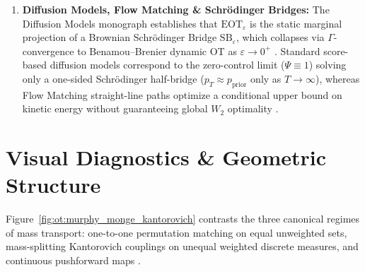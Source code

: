 \documentclass[../../../../master.tex]{subfiles}
\begin{document}
\begin{crossbook}
\begin{enumerate}[leftmargin=1.4em]
  \item \textbf{Diffusion Models, Flow Matching \& Schr\"odinger Bridges:} The Diffusion Models monograph establishes that $\mathrm{EOT}_\varepsilon$ is the static marginal projection of a Brownian Schr\"odinger Bridge $\mathrm{SB}_\varepsilon$, which collapses via $\Gamma$-convergence to Benamou--Brenier dynamic OT as $\varepsilon \to 0^+$ . Standard score-based diffusion models correspond to the zero-control limit ($\Psi \equiv 1$) solving only a one-sided Schr\"odinger half-bridge ($p_T \approx p_{\mathrm{prior}}$ only as $T \to \infty$), whereas Flow Matching straight-line paths optimize a conditional upper bound on kinetic energy without guaranteeing global $W_2$ optimality .
\end{enumerate}
\end{crossbook}

\section{Visual Diagnostics \& Geometric Structure}
\label{sec:ot:visuals}

Figure~\ref{fig:ot:murphy_monge_kantorovich} contrasts the three canonical regimes of mass transport: one-to-one permutation matching on equal unweighted sets, mass-splitting Kantorovich couplings on unequal weighted discrete measures, and continuous pushforward maps .

\end{document}
